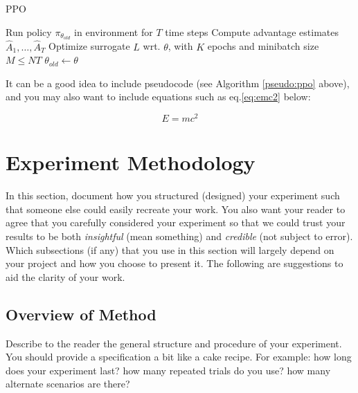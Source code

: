 \documentclass[conference]{IEEEtran}
\begin{document}
\begin{algorithm}
	\caption{PPO}\label{pseudo:ppo}
	\begin{algorithmic}[1]
				\State Run policy $\pi_{\theta_{old}}$ in environment for $T$ time steps
				\State Compute advantage estimates $\hat{A}_{1},\ldots,\hat{A}_{T}$
			\EndFor
			\State Optimize surrogate $L$ wrt. $\theta$, with $K$ epochs and minibatch size $M\leq NT$
			\State $\theta_{old}\leftarrow\theta$
		\EndFor
	\end{algorithmic} 
\end{algorithm}

It can be a good idea to include pseudocode (see Algorithm \ref{pseudo:ppo} above), and you may also want to include equations such as eq.\ref{eq:emc2} below:

\begin{equation}\label{eq:emc2}
E=mc^2
\end{equation}

\section{Experiment Methodology}

In this section, document how you structured (designed) your experiment such that someone else could easily recreate your work.  You also want your reader to agree that you carefully considered your experiment so that we could trust your results to be both \emph{insightful} (mean something) and \emph{credible} (not subject to error).  Which subsections (if any) that you use in this section will largely depend on your project and how you choose to present it.  The following are suggestions to aid the clarity of your work.

\subsection{Overview of Method}
Describe to the reader the general structure and procedure of your experiment. You should provide a specification a bit like a cake recipe.  For example: how long does your experiment last?  how many repeated trials do you use?  how many alternate scenarios are there?
\end{document}
